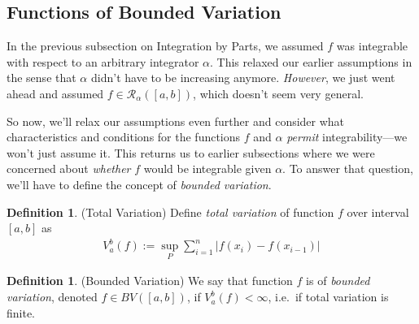 \documentclass[12pt]{article}
\numberwithin{equation}{section} %
\theoremstyle{plain}
\theoremstyle{definition}
\newtheorem{defn}[thm]{Definition}
\theoremstyle{remark}
\begin{document}
\newpage
\subsection{Functions of Bounded Variation}

In the previous subsection on Integration by Parts, we assumed $f$ was
integrable with respect to an arbitrary integrator $\alpha$.  This
relaxed our earlier assumptions in the sense that $\alpha$ didn't have
to be increasing anymore.  \emph{However}, we just went ahead and
assumed $f\in\mathscr{R}_\alpha([a,b])$, which doesn't seem very
general.

So now, we'll relax our assumptions even further and consider what
characteristics and conditions for the functions $f$ and $\alpha$
\emph{permit} integrability---we won't just assume it.
This returns us to earlier subsections where we were concerned about
\emph{whether} $f$ would be integrable given $\alpha$. To answer that
question, we'll have to define the concept of \emph{bounded variation}.

\begin{defn}(Total Variation)
Define \emph{total variation} of function $f$ over interval $[a,b]$ as
\begin{align*}
    V_a^b(f) := \sup_P \sum^n_{i=1} \left\lvert f(x_i) - f(x_{i-1})
    \right\rvert
\end{align*}
\end{defn}


\begin{defn}(Bounded Variation)
We say that function $f$ is of \emph{bounded variation}, denoted
$f \in BV([a,b])$, if $V^b_a(f)<\infty$, i.e.\ if total variation is
finite.
\end{defn}
\end{document}
